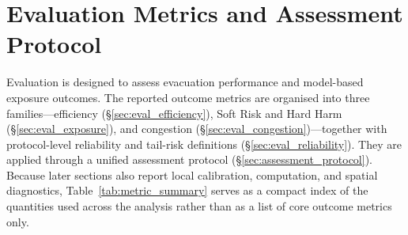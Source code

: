 \documentclass[preprint,12pt]{elsarticle}
\providecommand{\FloatBarrier}{}
\let\origsection\section
\renewcommand{\section}{\FloatBarrier\origsection}
\begin{document}
\FloatBarrier
\section{Evaluation Metrics and Assessment Protocol}
\label{sec:evaluation}

Evaluation is designed to assess evacuation performance and model-based
exposure outcomes. The reported outcome metrics are organised into three
families---efficiency (\S\ref{sec:eval_efficiency}), Soft Risk and Hard Harm
(\S\ref{sec:eval_exposure}), and congestion
(\S\ref{sec:eval_congestion})---together with protocol-level reliability
and tail-risk definitions (\S\ref{sec:eval_reliability}). They are applied
through a unified assessment protocol (\S\ref{sec:assessment_protocol}). Because later
sections also report local calibration, computation, and spatial
diagnostics, Table~\ref{tab:metric_summary} serves as a compact index of
the quantities used across the analysis rather than as a list of core
outcome metrics only.
\end{document}

